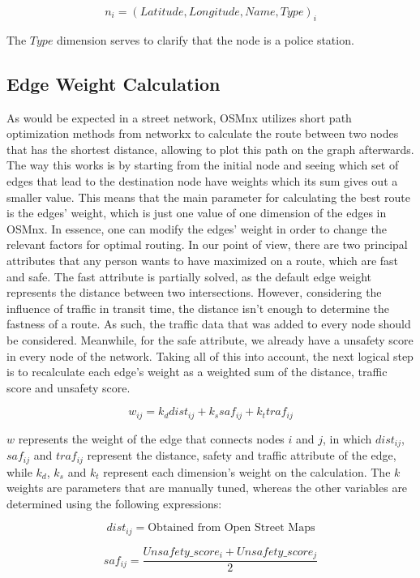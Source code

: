 \documentclass[runningheads]{llncs}
\begin{document}
$$n_i = (Latitude, Longitude, Name, Type)_i$$

The $Type$ dimension serves to clarify that the node is a police station.

\subsection{Edge Weight Calculation}

As would be expected in a street network, OSMnx utilizes short path optimization methods from networkx to calculate the route between two nodes that has the shortest distance, allowing to plot this path on the graph afterwards. The way this works is by starting from the initial node and seeing which set of edges that lead to the destination node have weights which its sum gives out a smaller value. This means that the main parameter for calculating the best route is the edges' weight, which is just one value of one dimension of the edges in OSMnx. In essence, one can modify the edges' weight in order to change the relevant factors for optimal routing. In our point of view, there are two principal attributes that any person wants to have maximized on a route, which are fast and safe. The fast attribute is partially solved, as the default edge weight represents the distance between two intersections. However, considering the influence of traffic in transit time, the distance isn't enough to determine the fastness of a route. As such, the traffic data that was added to every node should be considered. Meanwhile, for the safe attribute, we already have a unsafety score in every node of the network. Taking all of this into account, the next logical step is to recalculate each edge's weight as a weighted sum of the distance, traffic score and unsafety score. 

$$w_{ij} = k_d dist_{ij} + k_s saf_{ij} + k_t traf_{ij}$$

$w$ represents the weight of the edge that connects nodes $i$ and $j$, in which $dist_{ij}$, $saf_{ij}$ and $traf_{ij}$ represent the distance, safety and traffic attribute of the edge, while $k_d$, $k_s$ and $k_t$ represent each dimension's weight on the calculation. The $k$ weights are parameters that are manually tuned, whereas the other variables are determined using the following expressions:

$$dist_{ij} = \text{Obtained from Open Street Maps}$$

$$saf_{ij} = \frac{Unsafety\_score_{i} + Unsafety\_score_{j}}{2}$$ 
\end{document}
